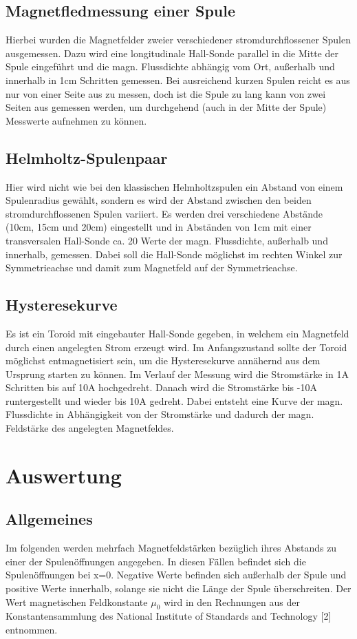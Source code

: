 \documentclass[titlepage = firstcover]{scrartcl}
\begin{document}
      \subsection{Magnetfledmessung einer Spule}
        Hierbei wurden die Magnetfelder zweier verschiedener stromdurchflossener Spulen ausgemessen. Dazu wird eine longitudinale Hall-Sonde parallel in die
        Mitte der Spule eingeführt und die magn. Flussdichte abhängig vom Ort, außerhalb und innerhalb in 1cm Schritten gemessen. Bei ausreichend kurzen Spulen reicht es aus nur von einer Seite aus
        zu messen, doch ist die Spule zu lang kann von zwei Seiten aus gemessen werden, um durchgehend (auch in der Mitte der Spule) Messwerte aufnehmen zu
        können.
      \subsection{Helmholtz-Spulenpaar}
        Hier wird nicht wie bei den klassischen Helmholtzspulen ein Abstand von einem Spulenradius gewählt, sondern es wird der Abstand zwischen den beiden
        stromdurchflossenen Spulen variiert. Es werden drei verschiedene Abstände (10cm, 15cm und 20cm) eingestellt und in Abständen von 1cm mit einer transversalen Hall-Sonde
        ca. 20 Werte der magn. Flussdichte, außerhalb und innerhalb, gemessen. Dabei soll die Hall-Sonde möglichst im rechten Winkel zur Symmetrieachse und
        damit zum Magnetfeld auf der Symmetrieachse.
      \subsection{Hysteresekurve}
        Es ist ein Toroid mit eingebauter Hall-Sonde gegeben, in welchem ein Magnetfeld durch einen angelegten Strom erzeugt wird. Im Anfangszustand sollte
        der Toroid möglichst entmagnetisiert sein, um die Hysteresekurve annähernd aus dem Ursprung starten zu können. Im Verlauf der Messung wird die
        Stromstärke in 1A Schritten bis auf 10A hochgedreht. Danach wird die Stromstärke bis -10A runtergestellt und wieder bis 10A gedreht.
        Dabei entsteht eine Kurve der magn. Flussdichte in Abhängigkeit von der Stromstärke und dadurch der magn. Feldstärke des angelegten Magnetfeldes.

        \section{Auswertung}
        \subsection{Allgemeines}
            Im folgenden werden mehrfach Magnetfeldstärken bezüglich ihres Abstands zu einer der Spulenöffnungen angegeben. In diesen Fällen befindet sich die 
            Spulenöffnungen bei x=0. Negative Werte befinden sich außerhalb der Spule und positive Werte innerhalb, solange sie nicht die Länge der Spule 
            überschreiten. Der Wert magnetischen Feldkonstante $\mu_0$ wird in den Rechnungen aus der Konstantensammlung des National Institute of Standards 
            and Technology [2] entnommen.
\end{document}
